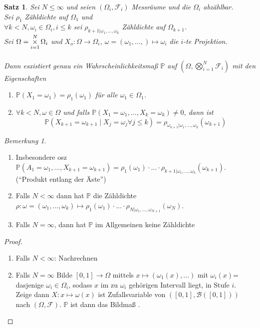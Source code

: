 \documentclass[10pt,a4paper]{article}
\newcommand{\Bor}{\mathscr B}
\newcommand{\bigtimes}{\operatornamewithlimits{\times}}
\newcommand{\Prb}{\mathbb P}
\newcommand{\scF}{\ensuremath{\mathscr{F}}}
\theoremstyle{plain}
\newtheorem{satz}[theorem]{Satz}
\theoremstyle{definition}
\theoremstyle{remark}
\newtheorem{bem}[theorem]{Bemerkung}
\begin{document}
	\begin{satz}\label{0308satz}
		Sei $N\leq\infty$ und seien $(\Omega_i,\scF_i)$ Messräume und die $\Omega_i$ abzählbar.\\
		Sei $\rho_1$ Zähldichte auf $\Omega_1$ und \\
		$\forall k<N,\omega_i\in\Omega_i,i\leq k$ sei $\rho_{k+1|\omega_1,...,\omega_k}$ Zähldichte auf $\Omega_{k+1}$.\\
		Sei $\Omega=\bigtimes\limits_{i=1}^N\Omega_i$ und $X_o:\Omega\to\Omega_i$, $\omega=(\omega_1,...,)\mapsto\omega_i$ die $i$-te Projektion.\\
		\\
		Dann esxistiert genau ein Wahrscheinlichkeitsmaß $\Prb$ auf $(\Omega,\bigotimes_{i=1}^N\scF_i)$ mit den Eigenschaften
		\begin{enumerate}[label=\alph*)]
			\item $\Prb(X_1=\omega_1)=\rho_1(\omega_1)$ für alle $\omega_1\in\Omega_1$.
			\item $\forall k<N,\omega\in\Omega$ und falls $\Prb(X_1=\omega_1,...,X_k=\omega_k)\neq 0$, dann ist
			\[\Prb(X_{k+1}=\omega_{k+1}\mid X_j=\omega_j\forall j\leq k)=\rho_{\omega_{k+1}|\omega_1,...,\omega_k}(\omega_{k+1})\]
		\end{enumerate}
	\end{satz}
	\begin{bem}
		\begin{enumerate}[label=\alph*)]
			\item Insbesondere osz $\Prb(A_1=\omega_1,...,X_{k+1}=\omega_{k+1})=\rho_1(\omega_1)\cdot...\cdot\rho_{k+1|\omega_1,...,\omega_k}(\omega_{k+1})$. (\enquote{Produkt entlang der Äste})
			\item Falls $N<\infty$ dann hat $\Prb$ die Zähldichte $\rho:\omega=(\omega_1,...,\omega_k)\mapsto\rho_1(\omega_1)\cdot...\cdot\rho_{N|\omega_1,...,\omega_{N+1}}(\omega_N)$.
			\item Falls $N=\infty$, dann hat $\Prb$ im Allgemeinen keine Zähldichte
		\end{enumerate}
	\end{bem}
	\begin{proof}
		\begin{enumerate}
			\item Falls $N<\infty$: Nachrechnen
			\item Falls $N=\infty$ Bilde $[0,1]\to\Omega$ mittels $x\mapsto(\omega_1(x),...)$ mit $\omega_i(x)$= dasjenige $\omega_i\in\Omega_i$, sodass $x$ im zu $\omega_i$ gehörigen Intervall liegt, in Stufe $i$.\\
			Zeige dann $X:x\mapsto\omega(x)$ ist Zufallsvariable von $([0,1],\Bor([0,1]))$ nach $(\Omega,\scF)$. $\Prb$ ist dann das Bildmaß .
		\end{enumerate}
	\end{proof}
	
\end{document}
